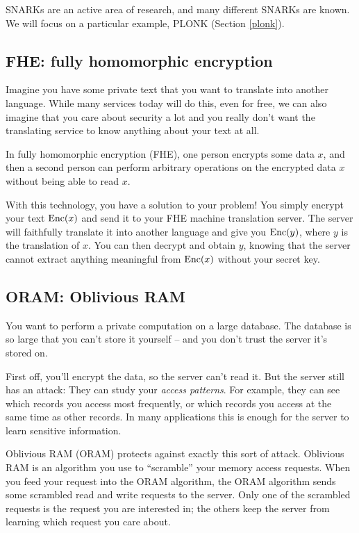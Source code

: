 SNARKs are an active area of research, and many different SNARKs are
known. We will focus on a particular example, PLONK (Section \ref{plonk}).

\subsection{FHE: fully homomorphic encryption}
Imagine you have some private text that you want to translate into
another language. While many services today will do this, even for free,
we can also imagine that you care about security a lot and you really don't
want the translating service to know anything about your text at all.

In \alert{fully homomorphic encryption (FHE)}, one person encrypts some
data $x$, and then a second person can perform arbitrary operations on
the encrypted data $x$ without being able to read $x$.

With this technology, you have a solution to your problem! You simply
encrypt your text $\operatorname{Enc}(x)$ and send it to your FHE
machine translation server. The server will faithfully translate it into
another language and give you $\operatorname{Enc}(y)$, where $y$ is
the translation of $x$. You can then decrypt and obtain $y$, knowing
that the server cannot extract anything meaningful from
$\operatorname{Enc}(x)$ without your secret key.

\subsection{ORAM: Oblivious RAM}
You want to perform a private computation on a large database. The
database is so large that you can't store it yourself -- and you don't
trust the server it's stored on.

First off, you'll encrypt the data, so the server can't read it. But
the server still has an attack: They can study your \emph{access
patterns}. For example, they can see which records you access most
frequently, or which records you access at the same time as other
records. In many applications this is enough for the server to learn
sensitive information.

\alert{Oblivious RAM (ORAM)} protects against exactly this sort of attack.
Oblivious RAM is an algorithm you use to ``scramble'' your
memory access requests. When you feed your request into the ORAM
algorithm, the ORAM algorithm sends some scrambled read and write
requests to the server. Only one of the scrambled requests is the
request you are interested in; the others keep the server from learning
which request you care about.

